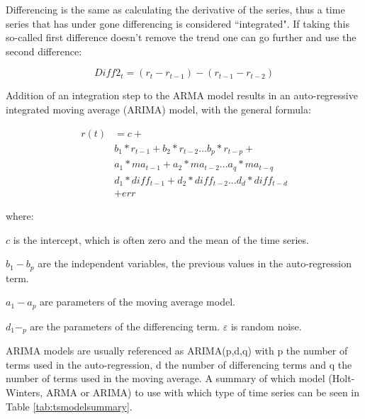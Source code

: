 Differencing is the same as calculating the derivative of the series, thus a time series that has under gone differencing is considered \textquotedblleft integrated". If taking this so-called first difference doesn't remove the trend one can go further and use the second difference:

\[ Diff2_{t}=(r_{t}-r_{t-1})-(r_{t-1}-r_{t-2}) \]

Addition of an integration step to the ARMA model results in an auto-regressive integrated moving average (ARIMA) model, with the general formula:


\begin{align*}
	r(t) & =   c+ \\
    & b_{1}*r_{t-1}+b_{2}*r_{t-2}...b_{p}*r_{t-p}+ \\ 
    & a_{1}*ma_{t-1}+a_{2}*ma_{t-2}...a_{q}*ma_{t-q} \\
    & d_{1}*diff_{t-1}+d_{2}*diff_{t-2} ... d_{d}*diff_{t-d} \\
    & +err
\end{align*}

where:

$ c $ is the intercept, which is often zero and the mean of the time series.

$ b_{1}-b_{p} $ are the independent variables, the previous values in the auto-regression term.

$ a_{1}-a_{p} $ are parameters of the moving average model.

$ d_{1}-_{p} $ are the parameters of the differencing term.
$ \varepsilon $ is random noise.


ARIMA models are usually referenced as ARIMA(p,d,q) with p the number of terms used in the auto-regression, d the number of differencing terms and q the number of terms used in the moving average. A summary of which model (Holt-Winters, ARMA or ARIMA) to use with which type of time series can be seen in Table \ref{tab:tsmodelsummary}.


